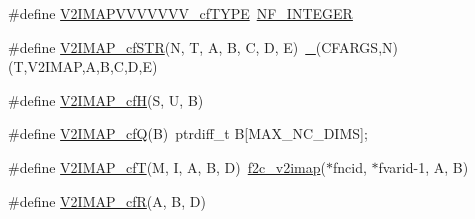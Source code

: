 \begin{DoxyCompactItemize}
\item 
\#define \hyperlink{fort-v2compat_8c_ac0311e2d4d244d1b662101115c69e3f5}{V2\+I\+M\+A\+P\+V\+V\+V\+V\+V\+V\+V\+\_\+cf\+T\+Y\+PE}~\hyperlink{ncfortran_8h_a0fd3f9e9fc30661142a1fb549af678e7}{N\+F\+\_\+\+I\+N\+T\+E\+G\+ER}
\item 
\#define \hyperlink{fort-v2compat_8c_a630377bcd05264463957043895a222be}{V2\+I\+M\+A\+P\+\_\+cf\+S\+TR}(N,  T,  A,  B,  C,  D,  E)~\hyperlink{cfortran_8h_ae5cd5aa262ffbc853d773293d00e4323}{\+\_\+}(C\+F\+A\+R\+GS,N)(T,V2\+I\+M\+AP,A,B,C,D,E)
\item 
\#define \hyperlink{fort-v2compat_8c_a87c7d454c2b4994cc79732ada66b2043}{V2\+I\+M\+A\+P\+\_\+cfH}(S,  U,  B)
\item 
\#define \hyperlink{fort-v2compat_8c_a1a93fb03e7683298bac9051269b200e7}{V2\+I\+M\+A\+P\+\_\+cfQ}(B)~ptrdiff\+\_\+t B\mbox{[}M\+A\+X\+\_\+\+N\+C\+\_\+\+D\+I\+MS\mbox{]};
\item 
\#define \hyperlink{fort-v2compat_8c_af30c5da58198e42fb61f784fc3ddfb3b}{V2\+I\+M\+A\+P\+\_\+cfT}(M,  I,  A,  B,  D)~\hyperlink{nf__v2compat_8c_a75a49e271d39db2186743d5deef88f7a}{f2c\+\_\+v2imap}($\ast$fncid, $\ast$fvarid-\/1, A, B)
\item 
\#define \hyperlink{fort-v2compat_8c_a87950246076603a36f8d6ed1a5b4892b}{V2\+I\+M\+A\+P\+\_\+cfR}(A,  B,  D)
\end{DoxyCompactItemize}
